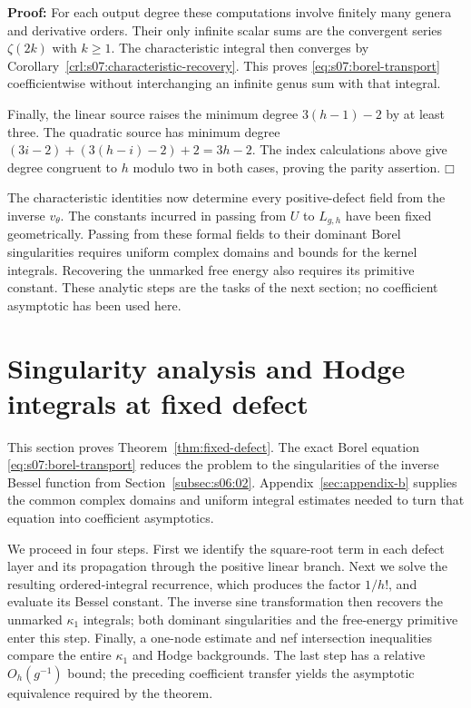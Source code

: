 \documentclass[a4paper,10pt]{article}
\numberwithin{equation}{section}
\theoremstyle{paperplain}
\theoremstyle{paperremark}
\theoremstyle{paperplain}
\newenvironment{prf}{\noindent \textbf{Proof: }}{\hfill $\mdlgwhtsquare$\par\addvspace{0.5\baselineskip}}
\begin{document}
\begin{prf}
For each output degree these computations involve finitely many
genera and derivative orders. Their only infinite scalar sums are
the convergent series $\zeta(2k)$ with $k\geq1$. The characteristic
integral then converges by Corollary~\ref{crl:s07:characteristic-recovery}.
This proves \eqref{eq:s07:borel-transport} coefficientwise without
interchanging an infinite genus sum with that integral.

Finally, the linear source raises the minimum degree
$3(h-1)-2$ by at least three. The quadratic source has minimum
degree $(3i-2)+(3(h-i)-2)+2=3h-2$.
The index calculations above give degree congruent to $h$ modulo
two in both cases, proving the parity assertion.
\end{prf}

The characteristic identities now determine every positive-defect
field from the inverse $v_\theta$. The constants incurred in passing
from $U$ to $L_{g,h}$ have been fixed geometrically. Passing from
these formal fields to their dominant Borel
singularities requires uniform complex domains and bounds for the
kernel integrals. Recovering the unmarked free energy also requires
its primitive constant. These analytic steps are the tasks of the
next section; no coefficient asymptotic has been used here.


\section{Singularity analysis and Hodge integrals at fixed defect}
\label{sec:s08}

This section proves Theorem~\ref{thm:fixed-defect}. The exact Borel
equation \eqref{eq:s07:borel-transport} reduces the problem to the
singularities of the inverse Bessel function from
Section~\ref{subsec:s06:02}. Appendix~\ref{sec:appendix-b} supplies
the common complex domains and uniform integral estimates needed to
turn that equation into coefficient asymptotics.

We proceed in four steps. First we identify the square-root term in
each defect layer and its propagation through the positive linear
branch. Next we solve the resulting ordered-integral recurrence,
which produces the factor $1/h!$, and evaluate its Bessel constant.
The inverse sine transformation then recovers the unmarked
$\kappa_1$ integrals; both dominant singularities and the free-energy
primitive enter this step. Finally, a one-node estimate and nef
intersection inequalities compare the entire $\kappa_1$ and Hodge
backgrounds. The last step has a relative $O_h(g^{-1})$ bound;
the preceding coefficient transfer yields the asymptotic equivalence
required by the theorem.
\end{document}
